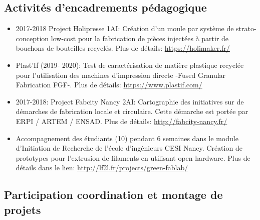 \documentclass[
  11pt,
]{article}
\begin{document}
\hypertarget{activituxe9s-dencadrements-puxe9dagogique}{%
\subsection{Activités d'encadrements
pédagogique}\label{activituxe9s-dencadrements-puxe9dagogique}}

\begin{itemize}
\item
  2017-2018 Project Holipresse 1AI: Création d'un moule par système de
  strato-conception low-cost pour la fabrication de pièces injectées à
  partir de bouchons de bouteilles recyclés. Plus de détails:
  \url{https://holimaker.fr/}
\item
  Plast'If (2019- 2020): Test de caractérisation de matière plastique
  recyclée pour l'utilisation des machines d'impression directe -Fused
  Granular Fabrication FGF-. Plus de détails:
  \url{https://www.plastif.com/}
\item
  2017-2018: Project Fabcity Nancy 2AI: Cartographie des initiatives sur
  de démarches de fabrication locale et circulaire. Cette démarche est
  portée par ERPI / ARTEM / ENSAD. Plus de détails:
  \url{http://fabcity-nancy.fr/}
\item
  Accompagnement des étudiants (10) pendant 6 semaines dans le module
  d'Initiation de Recherche de l'école d'ingénieurs CESI Nancy. Création
  de prototypes pour l'extrusion de filaments en utilisant open
  hardware. Plus de détails dans le lien:
  \url{http://lf2l.fr/projects/green-fablab/}
\end{itemize}

\hypertarget{participation-coordination-et-montage-de-projets}{%
\subsection{Participation coordination et montage de
projets}\label{participation-coordination-et-montage-de-projets}}
\end{document}
